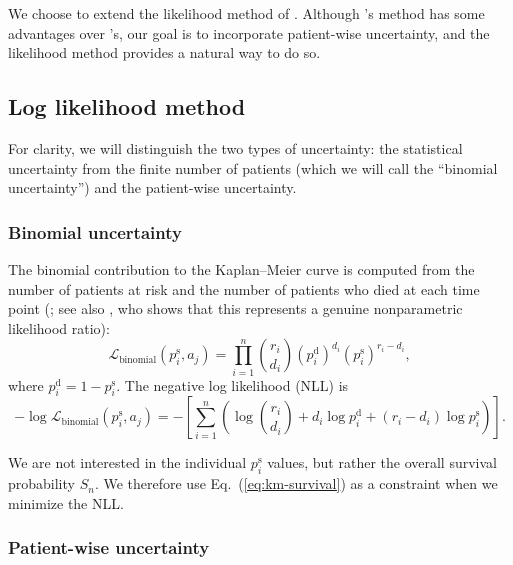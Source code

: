\documentclass[pdflatex,sn-basic]{sn-jnl}%
\theoremstyle{thmstyleone}%
\theoremstyle{thmstyletwo}%
\theoremstyle{thmstylethree}%
\newcommand{\KM}{Kaplan--Meier} %
\begin{document}
We choose to extend the likelihood method of \citet{ThomasGrunkemeier}.  Although \citeauthor{FayBrittainProschan2013}'s method has some advantages over \citeauthor{ThomasGrunkemeier}'s, our goal is to incorporate patient-wise uncertainty, and the likelihood method provides a natural way to do so.

\subsection{Log likelihood method}

For clarity, we will distinguish the two types of uncertainty: the statistical uncertainty from the finite number of patients (which we will call the ``binomial uncertainty'') and the patient-wise uncertainty.

\subsubsection{Binomial uncertainty}\label{sec:binomial-uncertainty}

The binomial contribution to the \KM{} curve is computed from the number of patients at risk and the number of patients who died at each time point (\citealp{ThomasGrunkemeier}; see also \citealp{Li1995}, who shows that this represents a genuine nonparametric likelihood ratio):
\begin{equation}
\mathcal{L}_{\text{binomial}}(p_i^\text{s}, a_j) = \prod_{i=1}^{n} \binom{r_i}{d_i} {\left(p_i^\text{d}\right)}^{d_i} {\left(p_i^\text{s}\right)}^{r_i-d_i},
\end{equation}
where \(p_i^\text{d} = 1 - p_i^\text{s}\). The negative log likelihood (NLL) is
\begin{equation}
-\log \mathcal{L}_{\text{binomial}}(p_i^\text{s}, a_j) = -\left[\sum_{i=1}^{n} \left( \log\binom{r_i}{d_i} + d_i \log p_i^\text{d} + (r_i-d_i) \log p_i^\text{s} \right)\right]. \label{eq:binomial-nll}
\end{equation}

We are not interested in the individual \(p_i^\text{s}\) values, but rather the overall survival probability \(S_n\). We therefore use Eq.~(\ref{eq:km-survival}) as a constraint when we minimize the NLL\@.

\subsubsection{Patient-wise uncertainty}\label{sec:patient-wise-uncertainty}
\end{document}
